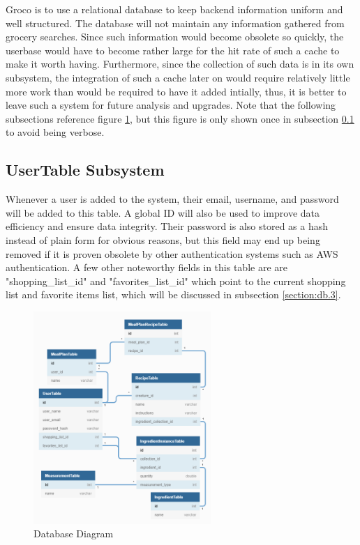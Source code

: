 Groco is to use a relational database to keep backend information uniform and well structured.  The database will not maintain any information gathered from grocery searches.  Since such information would become obsolete so quickly, the userbase would have to become rather large for the hit rate of such a cache to make it worth having.  Furthermore, since the collection of such data is in its own subsystem, the integration of such a cache later on would require relatively little more work than would be required to have it added intially, thus, it is better to leave such a system for future analysis and upgrades.  Note that the following subsections reference figure \ref{fig:db.1}, but this figure is only shown once in subsection \ref{section:db.1} to avoid being verbose.


\subsection{UserTable Subsystem}\label{section:db.1}
Whenever a user is added to the system, their email, username, and password will be added to this table.  A global ID will also be used to improve data efficiency and ensure data integrity.  Their password is also stored as a hash instead of plain form for obvious reasons, but this field may end up being removed if it is proven obsolete by other authentication systems such as AWS authentication.  A few other noteworthy fields in this table are are "shopping\_list\_id" and "favorites\_list\_id" which point to the current shopping list and favorite items list, which will be discussed in subsection \ref{section:db.3}.

\begin{figure}[h!]\label{fig:db.1}
	\centering
 	\includegraphics[width=0.60\textwidth]{images/Database}
 \caption{Database Diagram}
\end{figure}

